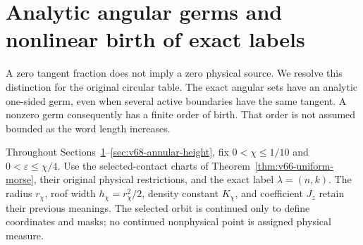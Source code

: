 \section{Analytic angular germs and nonlinear birth of exact labels}
\label{sec:v68-angular-germs}
A zero tangent fraction does not imply a zero physical source. We
resolve this distinction for the original circular table. The exact
angular sets have an analytic one-sided germ, even when several active
boundaries have the same tangent. A nonzero germ consequently has a
finite order of birth. That order is not assumed bounded as the word
length increases.

Throughout Sections~\ref{sec:v68-angular-germs}--\ref{sec:v68-annular-height},
fix $0<\chi\le1/10$ and $0<\varepsilon\le\chi/4$. Use the
selected-contact charts of Theorem~\ref{thm:v66-uniform-morse}, their
original physical restrictions, and the exact label $\lambda=(n,k)$.
The radius $r_\chi$, roof width $h_\chi=r_\chi^2/2$, density
constant $K_\chi$, and coefficient $J_z$ retain their previous meanings.
The selected orbit is continued only to define coordinates and masks;
no continued nonphysical point is assigned physical measure.

